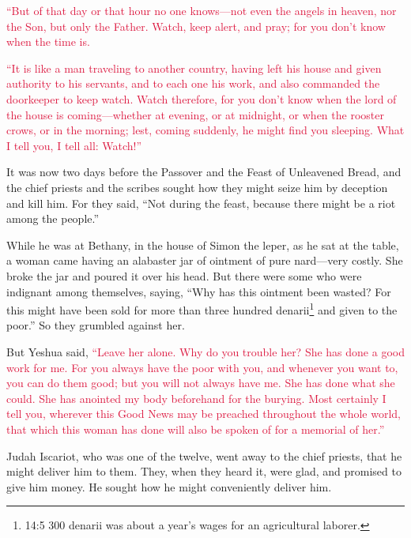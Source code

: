 \myverse{}\textcolor{crimson}{“But of that day or that hour no one knows—not even the
	angels in heaven, nor the Son, but only the Father.
}
\myverse{}\textcolor{crimson}{Watch, keep alert, and pray; for you don’t know when the time is.
}

\myverse{}\textcolor{crimson}{“It is like a man traveling to another country, having left
	his house and given authority to his servants, and to each one his work, and also commanded the doorkeeper
	to keep watch.
}
\myverse{}\textcolor{crimson}{Watch therefore, for you don’t know when the lord of the house is coming—whether
	at evening, or at midnight, or when the rooster crows, or in the morning;
}
\myverse{}\textcolor{crimson}{lest, coming suddenly, he might find you sleeping.
}
\myverse{}\textcolor{crimson}{What I tell you, I tell all: Watch!”}


\mychapter{} \myverse*{}It was now two days before the Passover and the Feast of Unleavened
Bread, and the chief priests and the scribes sought how they might seize him by deception and kill him.
\myverse{}For they said, “Not during the feast, because there might be a riot among the
people.”

\myverse{}While he was at Bethany, in the house of Simon the leper, as he
sat at the table, a woman came having an alabaster jar of ointment of pure nard—very costly. She broke
the jar and poured it over his head.
\myverse{}But there were some who were indignant among themselves, saying, “Why has this
ointment been wasted?
\myverse{}For this might have been sold for more than three hundred denarii\footnote{14:5 300 denarii was about a year’s wages for an agricultural laborer.
} and given to the poor.” So they grumbled against her.

\myverse{}But Yeshua said,
\textcolor{crimson}{“Leave her alone. Why do you trouble her? She has done a good work for me.
}
\myverse{}\textcolor{crimson}{For you always have the poor with you, and whenever you want to, you can
	do them good; but you will not always have me.
}
\myverse{}\textcolor{crimson}{She has done what she could. She has anointed my body beforehand for the
	burying.
}
\myverse{}\textcolor{crimson}{Most certainly I tell you, wherever this Good News may be preached throughout
	the whole world, that which this woman has done will also be spoken of for a memorial of her.”}

\myverse{}Judah Iscariot, who was one of the twelve, went away to the
chief priests, that he might deliver him to them.
\myverse{}They, when they heard it, were glad, and promised to give him money. He sought
how he might conveniently deliver him.

